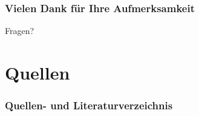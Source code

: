 \begin{frame}
    \frametitle{Vielen Dank für Ihre Aufmerksamkeit}

    \begin{center}
        Fragen?
    \end{center}
\end{frame}


\section{Quellen}

\begin{frame}[allowframebreaks]
    \frametitle{Quellen- und Literaturverzeichnis}

    \printbibliography[heading=none]    
\end{frame}